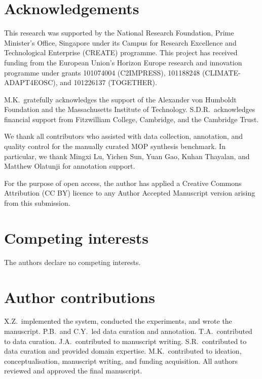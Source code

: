 \section*{Acknowledgements}
This research was supported by the National Research Foundation, Prime Minister’s Office, Singapore under its Campus for Research Excellence and Technological Enterprise (CREATE) programme. This project has received funding from the European Union’s Horizon Europe research and innovation programme under grants 101074004 (C2IMPRESS), 101188248 (CLIMATE-ADAPT4EOSC), and 101226137 (TOGETHER).

M.K.\ gratefully acknowledges the support of the Alexander von Humboldt Foundation and the Massachusetts Institute of Technology. S.D.R.\ acknowledges financial support from Fitzwilliam College, Cambridge, and the Cambridge Trust.

We thank all contributors who assisted with data collection, annotation, and quality control for the manually curated MOP synthesis benchmark. In particular, we thank Mingxi Lu, Yichen Sun, Yuan Gao, Kuhan Thayalan, and Matthew Olatunji for annotation support.

For the purpose of open access, the author has applied a Creative Commons Attribution (CC BY) licence to any Author Accepted Manuscript version arising from this submission.


\section*{Competing interests}
The authors declare no competing interests.

\section*{Author contributions}

X.Z.\ implemented the system, conducted the experiments, and wrote the manuscript. P.B.\ and C.Y.\ led data curation and annotation. T.A.\ contributed to data curation. J.A.\ contributed to manuscript writing. S.R.\ contributed to data curation and provided domain expertise. M.K.\ contributed to ideation, conceptualisation, manuscript writing, and funding acquisition. All authors reviewed and approved the final manuscript.

 
